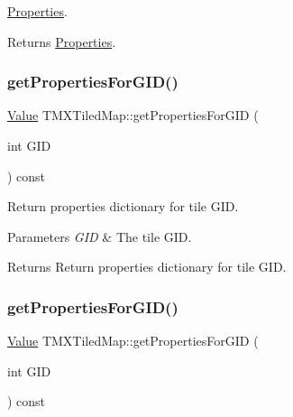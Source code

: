 \hyperlink{classProperties}{Properties}.

\begin{DoxyReturn}{Returns}
\hyperlink{classProperties}{Properties}. 
\end{DoxyReturn}
\mbox{\label{classTMXTiledMap_a11c3215d6e74d03d30afc4c693e84d89}} 
\subsubsection{\texorpdfstring{get\+Properties\+For\+G\+I\+D()}{getPropertiesForGID()}\hspace{0.1cm}{\footnotesize\ttfamily [1/4]}}
{\footnotesize\ttfamily \hyperlink{classValue}{Value} T\+M\+X\+Tiled\+Map\+::get\+Properties\+For\+G\+ID (\begin{DoxyParamCaption}\item[{int}]{G\+ID }\end{DoxyParamCaption}) const}

Return properties dictionary for tile G\+ID.


\begin{DoxyParams}{Parameters}
{\em G\+ID} & The tile G\+ID. \\
\hline
\end{DoxyParams}
\begin{DoxyReturn}{Returns}
Return properties dictionary for tile G\+ID. 
\end{DoxyReturn}
\mbox{\label{classTMXTiledMap_a11c3215d6e74d03d30afc4c693e84d89}} 
\subsubsection{\texorpdfstring{get\+Properties\+For\+G\+I\+D()}{getPropertiesForGID()}\hspace{0.1cm}{\footnotesize\ttfamily [2/4]}}
{\footnotesize\ttfamily \hyperlink{classValue}{Value} T\+M\+X\+Tiled\+Map\+::get\+Properties\+For\+G\+ID (\begin{DoxyParamCaption}\item[{int}]{G\+ID }\end{DoxyParamCaption}) const}

